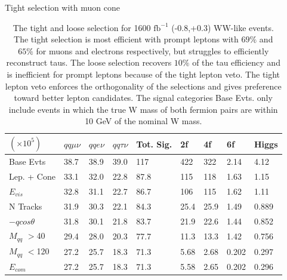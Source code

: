 \begin{table}

\caption{The tight and loose selection for 1600 $\text{fb}^{-1}$ (-0.8,+0.3) WW-like events. The tight selection is most efficient with prompt leptons with $69\%$ and $65\%$  for muons and electrons respectively, but struggles to efficiently reconstruct taus. The loose selection recovers $10\%$ of the tau efficiency and is inefficient for prompt leptons because of the tight lepton veto. The tight lepton veto enforces the orthogonality of the selections and gives preference toward better lepton candidates. The signal categories Base Evts. only include events in which the true W mass of both fermion pairs are within 10 GeV of the nominal W mass.}
\label{tab:selection}
 \scriptsize
 Tight selection with muon cone \\
   \begin{tabular}{|p{}|p{}p{}p{}p{}p{}p{}p{}p{}|}
\hline 
 $(\times 10^5)$  & $qq\mu\nu$ & $qqe\nu$ & $qq\tau\nu$ & Tot. Sig. & 2f & 4f & 6f & Higgs \\ \hline 
Base Evts & {38.7 } &  {38.9 } &  {39.0} & {117} &  {422} &  {322} &  {2.14} &  {4.12} \\ 

Lep. + Cone & {33.1 } &  {32.0 } &  {22.8} & {87.8} &  {115} &  {118} &  {1.63} &  {1.15} \\ 
 
$E_{vis}$ & {32.8 } &  {31.1 } &  {22.7} & {86.7} &  {106} &  {115} &  {1.62} &  {1.11} \\ 
 
N Tracks & {31.9 } &  {30.3 } &  {22.1} & {84.3} &  {25.4} &  {25.9} &  {1.49} &  {0.889} \\ 
 
$-qcos\theta$ & {31.8 } &  {30.1 } &  {21.8} & {83.7} &  {21.9} &  {22.6} &  {1.44} &  {0.852} \\ 
 
$M_{qq}$ $>$40 & {29.4 } &  {28.0 } &  {20.3} & {77.7} &  {11.3} &  {13.3} &  {1.42} &  {0.756} \\ 
 
$M_{qq}$ $<$120 & {27.2 } &  {25.7 } &  {18.3} & {71.3} &  {5.68} &  {2.68} &  {0.202} &  {0.297} \\ 
 
$E_{com}$ & {27.2 } &  {25.7} &  {18.3} & {71.3} &  {5.58} &  {2.65} &  {0.202} &  {0.296} \\ 


\end{tabular}
\end{table}
